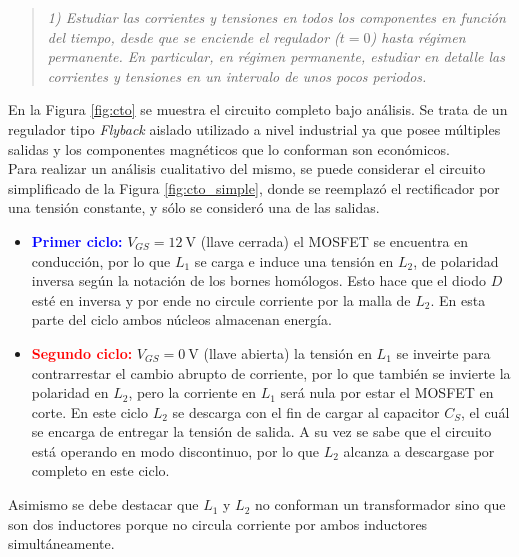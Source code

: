 \begin{quote} \textit{1) Estudiar las corrientes y tensiones en todos los componentes en función del tiempo, desde que se enciende el regulador ($t=0$) hasta régimen permanente. En particular, en régimen permanente, estudiar en detalle las corrientes y tensiones en un intervalo de unos pocos periodos.}
\end{quote}


	En la Figura \ref{fig:cto} se muestra el circuito completo bajo análisis. Se trata de un regulador tipo \textit{Flyback} aislado utilizado a nivel industrial ya que posee múltiples salidas y los componentes magnéticos que lo conforman son económicos.\\
\indent Para realizar un análisis cualitativo del mismo, se puede considerar el circuito simplificado de la Figura \ref{fig:cto_simple}, donde se reemplazó el rectificador por una tensión constante, y sólo se consideró una de las salidas.


\begin{itemize}
	\item \textcolor{blue}{\textbf{Primer ciclo:}} $V_{GS}=\SI{12}{\volt}$ (llave cerrada) el MOSFET se encuentra en conducción, por lo que $L_1$ se carga e induce una tensión en $L_2$, de polaridad inversa según la notación de los bornes homólogos. Esto hace que el diodo $D$ esté en inversa y por ende no circule corriente por la malla de $L_2$. En esta parte del ciclo ambos núcleos almacenan energía.

	\item \textcolor{red}{\textbf{Segundo ciclo:}} $V_{GS} = \SI{0}{\volt}$ (llave abierta) la tensión en $L_1$ se inveirte para contrarrestar el cambio abrupto de corriente, por lo que también se invierte la polaridad en $L_2$, pero la corriente en $L_1$ será nula por estar el MOSFET en corte.
		En este ciclo $L_2$ se descarga con el fin de cargar al capacitor $C_S$, el cuál se encarga de entregar la tensión de salida. A su vez se sabe que el circuito está operando en modo discontinuo, por lo que $L_2$ alcanza a descargase por completo en este ciclo.
\end{itemize}


	Asimismo se debe destacar que $L_1$ y $L_2$ no conforman un transformador sino que son dos inductores porque no circula corriente por ambos inductores simultáneamente.

